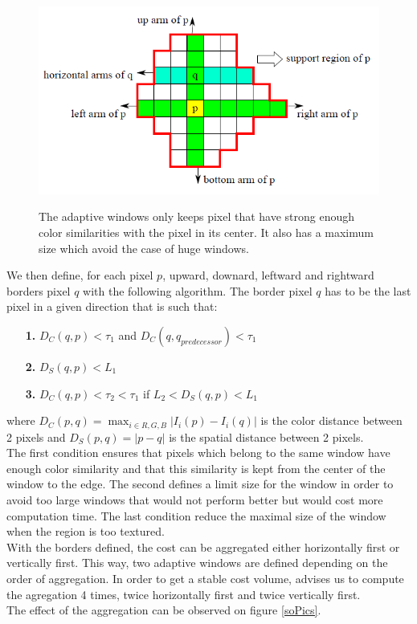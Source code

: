 \documentclass{article}
\begin{document}
\begin{figure}[h]
\begin{center}	
\includegraphics[scale=0.8]{Images/cost_computation.png}
	\label{cost_computation}
	\caption{ The adaptive windows only keeps pixel that have strong enough color similarities with the pixel in its center. It also has a maximum size which avoid the case of huge windows.}
\end{center}
\end{figure}

We then define, for each pixel $p$, upward, downard, leftward and rightward borders pixel $q$ with the following algorithm. The border pixel $q$ has to be the last pixel in a given direction that is such that:
\begin{itemize}
	\item[\textbf{1. }]$D_C(q, p) < \tau_1$ and $D_C(q, q_{predecessor}) < \tau_1$
	\item[\textbf{2. }]$D_S(q, p) < L_1$
	\item[\textbf{3. }]$D_C(q, p) < \tau_2 < \tau_1$ if $L_2 <  D_S(q, p) < L_1$
\end{itemize}
where $D_C(p, q) = \max_{i \in R, G, B} |I_i(p) - I_i(q)|$ is the color distance between 2 pixels and  $D_S(p, q) = |p - q|$ is the spatial distance between 2 pixels.\\
The first condition ensures that pixels which belong to the same window have enough color similarity and that this similarity is kept from the center of the window to the edge. The second defines a limit size for the window in order to avoid too large windows that would not perform better but would cost more computation time. The last condition reduce the maximal size of the window when the region is too textured.\\
With the borders defined, the cost can be aggregated either horizontally first or vertically first. This way, two adaptive windows are defined depending on the order of aggregation. In order to get a stable cost volume, \cite{adCensus} advises us to compute the agregation 4 times, twice horizontally first and twice vertically first.\\
The effect of the aggregation can be observed on figure \ref{soPics}.
\end{document}
